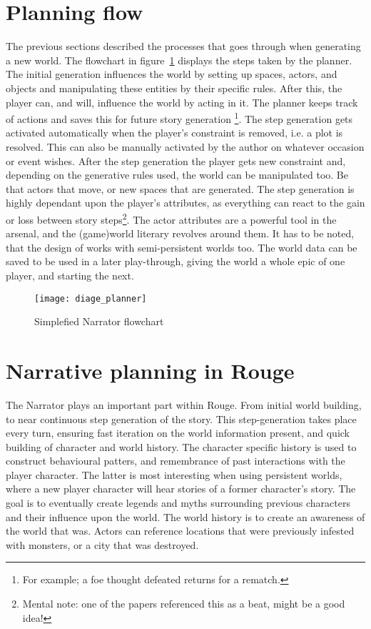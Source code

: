 \section{Planning flow}
The previous sections described the processes that \diage goes through when generating a new world.
The flowchart in figure~\ref{fig:diage_flowchart} displays the steps taken by the planner.
The initial generation influences the world by setting up spaces, actors, and objects and manipulating these entities by their specific rules.
After this, the player can, and will, influence the world by acting in it.
The planner keeps track of \his actions and saves this for future story generation \footnote{For example; a foe thought defeated returns for a rematch.}.
The step generation gets activated automatically when the player's constraint is removed, i.e.
a plot is resolved.
This can also be manually activated by the author on whatever occasion or event \he wishes.
After the step generation the player gets \his new constraint and, depending on the generative rules used, the world can be manipulated too.
Be that actors that move, or new spaces that are generated.
The step generation is highly dependant upon the player's attributes, as everything can react to the gain or loss between story steps\footnote{Mental note: one of the papers referenced this as a beat, might be a good idea!}.
The actor attributes are a powerful tool in the \diage arsenal, and the (game)world literary revolves around them.
It has to be noted, that the design of \diage works with semi-persistent worlds too.
The world data can be saved to be used in a later play-through, giving the world a whole epic of one player, and starting the next.
\begin{figure}[p]
\texttt{[image: diage\_planner]}
\caption{Simplefied Narrator flowchart}\label{fig:diage_flowchart}
\end{figure}

\section{Narrative planning in Rouge}
The Narrator plays an important part within Rouge.
From initial world building, to near continuous step generation of the story.
This step-generation takes place every turn, ensuring fast iteration on the world information present, and quick building of character and world history. 
The character specific history is used to construct behavioural patters, and remembrance of past interactions with the player character.
The latter is most interesting when using persistent worlds, where a new player character will hear stories of a former character's story. 
The goal is to eventually create legends and myths surrounding previous characters and their influence upon the world. 
The world history is to create an awareness of the world that was. 
Actors can reference locations that were previously infested with monsters, or a city that was destroyed.










